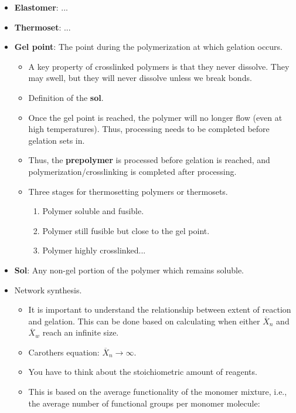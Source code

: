 \documentclass[../notes.tex]{subfiles}
\begin{document}
\begin{itemize}
\begin{itemize}
    \end{itemize}
    \item \textbf{Elastomer}: ...
    \item \textbf{Thermoset}: ...
    \item \textbf{Gel point}: The point during the polymerization at which gelation occurs.
    \begin{itemize}
        \item A key property of crosslinked polymers is that they never dissolve. They may swell, but they will never dissolve unless we break bonds.
        \item Definition of the \textbf{sol}.
        \item Once the gel point is reached, the polymer will no longer flow (even at high temperatures). Thus, processing needs to be completed before gelation sets in.
        \item Thus, the \textbf{prepolymer} is processed before gelation is reached, and polymerization/crosslinking is completed after processing.
        \item Three stages for thermosetting polymers or thermosets.
        \begin{enumerate}
            \item Polymer soluble and fusible.
            \item Polymer still fusible but close to the gel point.
            \item Polymer highly crosslinked...
        \end{enumerate}
    \end{itemize}
    \item \textbf{Sol}: Any non-gel portion of the polymer which remains soluble.
    \item Network synthesis.
    \begin{itemize}
        \item It is important to understand the relationship between extent of reaction and gelation. This can be done based on calculating when either $\overline{X}_n$ and $\overline{X}_w$ reach an infinite size.
        \item Carothers equation: $\overline{X}_n\to\infty$.
        \item You have to think about the stoichiometric amount of reagents.
        \item This is based on the average functionality of the monomer mixture, i.e., the average number of functional groups per monomer molecule:
        \begin{equation*}

\end{equation*}
\end{itemize}
\end{itemize}
\end{document}
